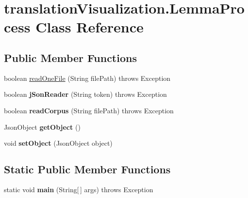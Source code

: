 \hypertarget{classtranslation_visualization_1_1_lemma_process}{}\section{translation\+Visualization.\+Lemma\+Process Class Reference}
\label{classtranslation_visualization_1_1_lemma_process}
\subsection*{Public Member Functions}
\begin{DoxyCompactItemize}
\item 
boolean \hyperlink{classtranslation_visualization_1_1_lemma_process_a656e29720f5593558d6971ca558c0fec}{read\+One\+File} (String file\+Path)  throws Exception 
\item 
\mbox{\label{classtranslation_visualization_1_1_lemma_process_afd2863c7ef9f429d7a0ba85c0157bc15}} 
boolean {\bfseries j\+Son\+Reader} (String token)  throws Exception 
\item 
\mbox{\label{classtranslation_visualization_1_1_lemma_process_a7fed4b719bc49ddfef2c3c1f64c33838}} 
boolean {\bfseries read\+Corpus} (String file\+Path)  throws Exception 
\item 
\mbox{\label{classtranslation_visualization_1_1_lemma_process_a233bd6a02d8bcdc14860fccfed4e9291}} 
Json\+Object {\bfseries get\+Object} ()
\item 
\mbox{\label{classtranslation_visualization_1_1_lemma_process_ac3af8423f4a266e5f8530493c8abd83d}} 
void {\bfseries set\+Object} (Json\+Object object)
\end{DoxyCompactItemize}
\subsection*{Static Public Member Functions}
\begin{DoxyCompactItemize}
\item 
\mbox{\label{classtranslation_visualization_1_1_lemma_process_a214c3b0837f6d7331ce106ed81643865}} 
static void {\bfseries main} (String\mbox{[}$\,$\mbox{]} args)  throws Exception 
\end{DoxyCompactItemize}


